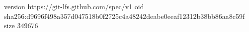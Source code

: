 version https://git-lfs.github.com/spec/v1
oid sha256:d9696f498a357d047518b0f2725c4a48242deabe0eeaf12312b38bb86aa8c59f
size 349676
